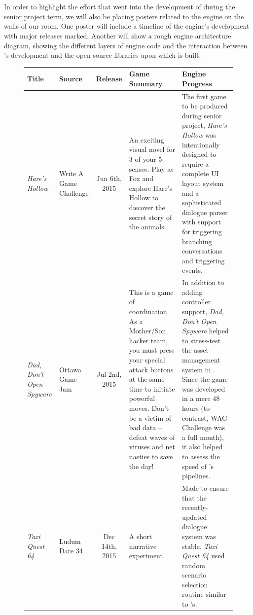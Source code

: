 \documentclass{GlobalDocument}
\begin{document}
\section{\ourengine{}}
In order to highlight the effort that went into the development of \ourengine{} during the senior project term, we will also be placing posters related to the engine on the walls of our room. One poster will include a timeline of the engine's development with major releases marked. Another will show a rough engine architecture diagram, showing the different layers of engine code and the interaction between \ourteam{}'s development and the open-source libraries upon which \ourengine{} is built.

\begin{figure}[htb]
\centering
    \begin{tabular}{ | p{3cm} | p{3cm} | c | p{5.5cm} | p{6cm} |}
    \hline
    Title & Source & Release & Game Summary & Engine Progress \\ \hline
    
    \textit{Hare's Hollow}&
    Write A Game Challenge&
    Jun 6th, 2015&
    An exciting visual novel for 3 of your 5 senses. Play as Fox and explore Hare's Hollow to discover the secret story of the animals.&
    The first game to be produced during senior project, \textit{Hare's Hollow} was intentionally designed to require a complete UI layout system and a sophisticated dialogue parser with support for triggering branching conversations and triggering events.\\ \hline
    
    \textit{Dad, Don't Open Spyware}&
    Ottawa Game Jam&
    Jul 2nd, 2015&
    This is a game of coordination. As a Mother/Son hacker team, you must press your special attack buttons at the same time to initiate powerful moves. Don't be a victim of bad data -- defeat waves of viruses and net nasties to save the day!&
    In addition to adding controller support, \textit{Dad, Don't Open Spyware} helped to stress-test the asset management system in \ourengine{}. Since the game was developed in a mere 48 hours (to contrast, WAG Challenge was a full month), it also helped to assess the speed of \ourteam{}'s pipelines.\\ \hline
    
    \textit{Taxi Quest 64}&
    Ludum Dare 34 &
    Dec 14th, 2015&
    A short narrative experiment.&
    Made to ensure that the recently-updated dialogue system was stable, \textit{Taxi Quest 64} used random scenario selection routine similar to \ourgame{}'s.\\ \hline
        

\end{tabular}
\end{figure}
\end{document}

